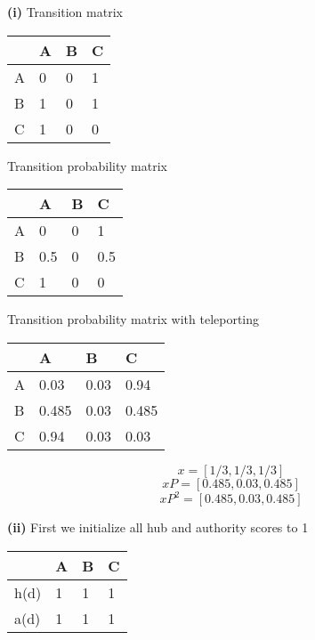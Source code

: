 \documentclass[11pt,a4paper]{report}
\begin{document}
\begin{multicols*}{2}
\begin{center}
\end{center}

\noindent \textbf{(i)} Transition matrix
\begin{center}
\begin{tabular}{ |l|l|l|l| }
    \hline
      & A  & B  & C \\
    \hline
    A & 0  & 0  & 1  \\
    B & 1  & 0  & 1  \\
    C & 1  & 0  & 0  \\
    \hline
\end{tabular}
\end{center}

\noindent Transition probability matrix
\begin{center}
\begin{tabular}{ |l|l|l|l| }
    \hline
      & A    & B  & C \\
    \hline
    A & 0    & 0  & 1  \\
    B & 0.5  & 0  & 0.5  \\
    C & 1    & 0  & 0  \\
    \hline
\end{tabular}
\end{center}

\noindent Transition probability matrix with teleporting
\begin{center}
\begin{tabular}{ |l|l|l|l| }
    \hline
      & A    & B    & C      \\
    \hline
    A & 0.03  & 0.03 & 0.94  \\
    B & 0.485 & 0.03 & 0.485 \\
    C & 0.94  & 0.03 & 0.03  \\
    \hline
\end{tabular}
\end{center}

$$x = [1/3,1/3,1/3]$$
$$xP = [0.485, 0.03, 0.485]$$
$$xP^2 = [0.485, 0.03, 0.485]$$

\noindent \textbf{(ii)} First we initialize all hub and authority scores to 1
\begin{center}
\begin{tabular}{ |l|l|l|l| }
    \hline
         & A & B & C \\
    \hline
    h(d) & 1 & 1 & 1 \\
    a(d) & 1 & 1 & 1 \\
    \hline
\end{tabular}
\end{center}


\end{multicols*}
\end{document}
